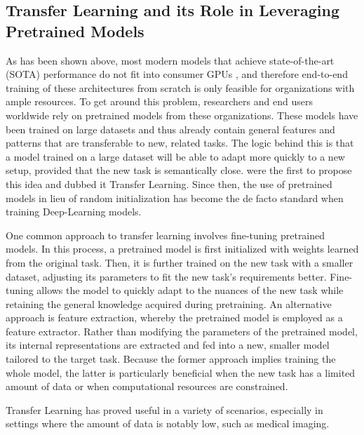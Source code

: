 \subsection{Transfer Learning and its Role in Leveraging Pretrained Models}
As has been shown above, most modern models that achieve state-of-the-art (SOTA) performance do not fit into consumer GPUs , and therefore end-to-end training of these architectures from scratch is only feasible for organizations with ample resources. To get around this problem, researchers and end users worldwide rely on pretrained models from these organizations. These models have been trained on large datasets and thus already contain general features and patterns that are transferable to new, related tasks. The logic behind this is that a model trained on a large dataset will be able to adapt more quickly to a new setup, provided that the new task is semantically close.  were the first to propose this idea and dubbed it Transfer Learning. Since then, the use of pretrained models in lieu of random initialization has become the de facto standard when training Deep-Learning models.

One common approach to transfer learning involves fine-tuning pretrained models. In this process, a pretrained model is first initialized with weights learned from the original task. Then, it is further trained on the new task with a smaller dataset, adjusting its parameters to fit the new task's requirements better. Fine-tuning allows the model to quickly adapt to the nuances of the new task while retaining the general knowledge acquired during pretraining. An alternative approach is feature extraction, whereby the pretrained model is employed as a feature extractor. Rather than modifying the parameters of the pretrained model, its internal representations are extracted and fed into a new, smaller model tailored to the target task. Because the former approach implies training the whole model, the latter is particularly beneficial when the new task has a limited amount of data or when computational resources are constrained.

Transfer Learning has proved useful in a variety of scenarios, especially in settings where the amount of data is notably low, such as medical imaging. 

